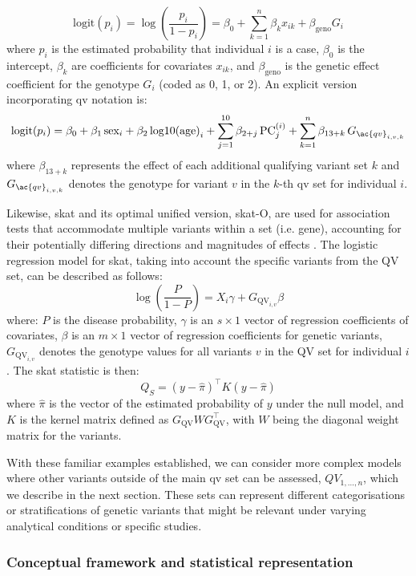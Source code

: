 $$
\text{logit}(p_i) = \log\left(\frac{p_i}{1 - p_i}\right) = \beta_0 + \sum_{k=1}^n \beta_k x_{ik} + \beta_{\text{geno}} G_i
$$
where \( p_i \) is the estimated probability that individual \( i \) is a case, \( \beta_0 \) is the intercept, \( \beta_k \) are coefficients for covariates \( x_{ik} \), and \( \beta_{\text{geno}} \) is the genetic effect coefficient for the genotype \( G_i \) (coded as 0, 1, or 2). An explicit version incorporating \ac{qv} notation is:
$$
\text{logit}(p_i) = \beta_0 + \beta_1\,\text{sex}_i + \beta_2\,\text{log10(age)}_i + \sum_{j=1}^{10} \beta_{2+j}\,\text{PC}_j^{(i)} + \sum_{k=1}^{n} \beta_{13+k}\,G_{\ac{qv}_{i,v,k}}
$$
where \( \beta_{13+k} \) represents the effect of each additional qualifying variant set \( k \) and \( G_{\ac{qv}_{i,v,k}} \) denotes the genotype for variant \( v \) in the \( k \)-th \ac{qv} set for individual \( i \).

Likewise, \ac{skat} and its optimal unified version, \ac{skat}-O, 
are used for association tests that accommodate multiple variants within a set (i.e. gene), accounting for their potentially differing directions and magnitudes of effects
\cite{wu2011rare, lee2012optimal}. 
The logistic regression model for \ac{skat}, taking into account the specific variants from the QV set, can be described as follows:
$$
\log \left( \frac{P}{1-P} \right) = X_i \gamma + G_{\text{QV}_{i,v}} \beta
$$
where:
\( P \) is the disease probability,
\( \gamma \) is an \( s \times 1 \) vector of regression coefficients of covariates,
\( \beta \) is an \( m \times 1 \) vector of regression coefficients for genetic variants,
\( G_{\text{QV}_{i,v}} \) denotes the genotype values for all variants \( v \) in the QV set for individual \( i \).
The \ac{skat} statistic is then:
$$
Q_S = (y - \hat{\pi})^\top K (y - \hat{\pi})
$$
where \( \hat{\pi} \) is the vector of the estimated probability of \( y \) under the null model, and \( K \) is the kernel matrix defined as \( G_{\text{QV}} W G_{\text{QV}}^\top \), with \( W \) being the diagonal weight matrix for the variants.

With these familiar examples established, we can consider more complex models where other variants outside of the main \ac{qv} set can be assessed,  $QV_{1,...,n} $,
which we describe in the next section. 
These sets can represent different categorisations or stratifications of genetic variants that might be relevant under varying analytical conditions or specific studies.

\subsubsection{Conceptual framework and statistical representation}

